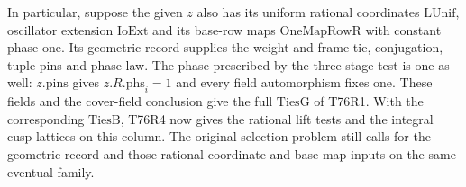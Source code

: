 In particular, suppose the given $z$ also has its uniform
rational coordinates $\mathrm{LUnif}$, oscillator extension
$\mathrm{IoExt}$ and its base-row maps $\mathrm{OneMapRowR}$
with constant phase one. Its geometric record supplies the
weight and frame tie, conjugation, tuple pins and phase law.
The phase prescribed by the three-stage test is one as well:
$z.\mathrm{pins}$ gives $z.R.\mathrm{phs}_i=1$ and every
field automorphism fixes one. These fields and the cover-field
conclusion give the full $\mathrm{TiesG}$ of T76R1. With the
corresponding $\mathrm{TiesB}$, T76R4 now gives the rational
lift tests and the integral cusp lattices on this column.
The original selection problem still calls for the geometric
record and those rational coordinate and base-map inputs on the
same eventual family.
